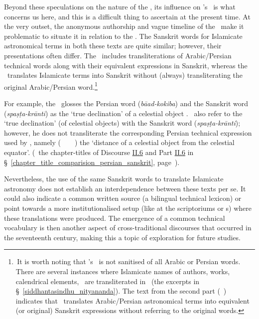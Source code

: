 Beyond these speculations on the nature of the \Hayatagrantha, its influence on \Nityananda's \Siddhantasindhu\ is what concerns us here, and this is a difficult thing to ascertain at the present time. At the very outset, the anonymous authorship and vague timeline of the \Hayatagrantha\ make it problematic to situate it in relation to the \Siddhantasindhu. The Sanskrit words for Islamicate astronomical terms in both these texts are quite similar; however, their presentations often differ. 
The \Hayatagrantha\ includes transliterations of Arabic/Persian technical words along with their equivalent expressions in Sanskrit, whereas the \Siddhantasindhu\ translates Islamicate terms into Sanskrit without (always) transliterating the original Arabic/Persian word.\footnote{\,It is worth noting that \Nityananda's \Siddhantasindhu\ is not sanitised of all Arabic or Persian words. There are several instances where Islamicate names of authors, works, calendrical elements, \etcp\ are transliterated in \Nagari\ (\eg the excerpts in \S~\ref{siddhantasindhu_nityananda}). The text from the second part (\dvitiya\ \kanda) indicates that \Nityananda\ translates Arabic/Persian astronomical terms into equivalent (or original) Sanskrit expressions without referring to the original words.} 

For example, the \Hayatagrantha\ glosses the Persian word  (\textit{bāad-kokiba}) and the Sanskrit word  (\textit{spaṣṭa-krānti}) as the `true declination' of a celestial object \parencite[p., lines 2--4]{BhattacaryaHayata}. \Nityananda\ also 
refer to the `true declination' (of celestial objects) with the Sanskrit word  (\textit{spaṣṭa-krānti}); however, he does not transliterate the corresponding Persian technical expression used by \MullaFarid, namely  (\bud\idafaconsonant\ \kawakib\ \az\ \muaddil\ \alnahar) the `distance of a celestial object from the celestial equator'. (\Vid\ the chapter-titles of Discourse \hyperlink{Pii6}{II.6} and Part \hyperlink{Sii6}{II.6} in \S~\ref{chapter_title_comparision_persian_sanskrit}, page~\pageref{discourse_part_6_chapter_title_example}).


Nevertheless, the use of the same Sanskrit words to translate Islamicate astronomy does not establish an interdependence between these texts per se. It could also indicate a common written source (\eg a bilingual technical lexicon) or point towards a more institutionalised setup (like at the scriptoriums or \maktabkhana s) where these translations were produced. The emergence of a common technical vocabulary is then another aspect of cross-traditional discourses that occurred in the seventeenth century, making this a topic of exploration for future studies.   

